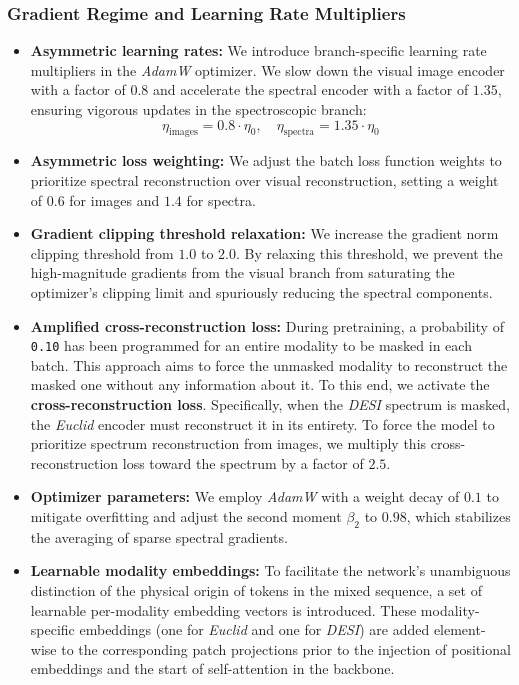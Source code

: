 \subsubsection{Gradient Regime and Learning Rate Multipliers}

\begin{itemize}
\item \textbf{Asymmetric learning rates:} We introduce branch-specific learning rate multipliers in the \textit{AdamW} optimizer. We slow down the visual image encoder with a factor of $0.8$ and accelerate the spectral encoder with a factor of $1.35$, ensuring vigorous updates in the spectroscopic branch:
    \begin{equation}
    \eta_{\text{images}} = 0.8 \cdot \eta_0, \quad \eta_{\text{spectra}} = 1.35 \cdot \eta_0
    \label{eq:learning_rates}
    \end{equation}
    
\item \textbf{Asymmetric loss weighting:} We adjust the batch loss function weights to prioritize spectral reconstruction over visual reconstruction, setting a weight of $0.6$ for images and $1.4$ for spectra.

\item \textbf{Gradient clipping threshold relaxation:} We increase the gradient norm clipping threshold from $1.0$ to $2.0$. By relaxing this threshold, we prevent the high-magnitude gradients from the visual branch from saturating the optimizer's clipping limit and spuriously reducing the spectral components.

\item \textbf{Amplified cross-reconstruction loss:} During pretraining, a probability of \texttt{0.10} has been programmed for an entire modality to be masked in each batch. This approach aims to force the unmasked modality to reconstruct the masked one without any information about it. To this end, we activate the \textbf{cross-reconstruction loss}. Specifically, when the \textit{\gls{DESI}} spectrum is masked, the \textit{Euclid} encoder must reconstruct it in its entirety. To force the model to prioritize spectrum reconstruction from images, we multiply this cross-reconstruction loss toward the spectrum by a factor of $2.5$.

\item \textbf{Optimizer parameters:} We employ \textit{AdamW} with a weight decay of $0.1$ to mitigate overfitting and adjust the second moment $\beta_2$ to $0.98$, which stabilizes the averaging of sparse spectral gradients.

\item \textbf{Learnable modality embeddings:} To facilitate the network's unambiguous distinction of the physical origin of tokens in the mixed sequence, a set of learnable per-modality embedding vectors is introduced. These modality-specific embeddings (one for \textit{Euclid} and one for \textit{\gls{DESI}}) are added element-wise to the corresponding patch projections prior to the injection of positional embeddings and the start of self-attention in the backbone.
\end{itemize}


